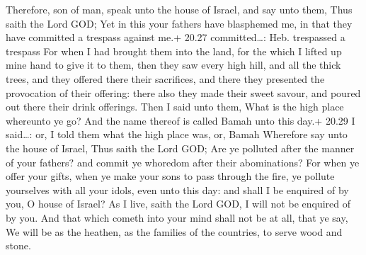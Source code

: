  Therefore, son of man, speak unto the house of Israel,
and say unto them, Thus saith the Lord GOD; Yet in this your fathers
have blasphemed me, in that they have committed a trespass against me.+
20.27 committed\ldots: Heb. trespassed a trespass  For when
I had brought them into the land, for the which I lifted up mine hand to
give it to them, then they saw every high hill, and all the thick trees,
and they offered there their sacrifices, and there they presented the
provocation of their offering: there also they made their sweet savour,
and poured out there their drink offerings.  Then I said
unto them, What is the high place whereunto ye go? And the name thereof
is called Bamah unto this day.+ 20.29 I said\ldots: or, I told them what
the high place was, or, Bamah  Wherefore say unto the house
of Israel, Thus saith the Lord GOD; Are ye polluted after the manner of
your fathers? and commit ye whoredom after their abominations?
 For when ye offer your gifts, when ye make your sons to
pass through the fire, ye pollute yourselves with all your idols, even
unto this day: and shall I be enquired of by you, O house of Israel? As
I live, saith the Lord GOD, I will not be enquired of by you.
 And that which cometh into your mind shall not be at all,
that ye say, We will be as the heathen, as the families of the
countries, to serve wood and stone.

